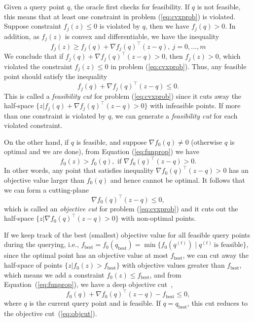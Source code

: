 Given a query point $q$, the oracle first checks for feasibility.
If $q$ is not feasible, this means that at least one constraint in problem (\ref{eq:cvxprob}) is violated.
Suppose constraint $f_j(z) \le 0$ is violated by $q$, then we have $f_j(q) > 0$.
In addition, as $f_j(z)$ is convex and differentiable, we have the inequality
\begin{equation}
\label{eq:funprop}
f_j(z) \ge f_j(q) + \nabla f_j(q)^\top (z - q),~ j = 0, \dots, m
\end{equation}
We conclude that if $f_j(q) + \nabla f_j(q)^\top (z - q) > 0$, then $f_j(z) > 0$, 
which violated the constraint $f_j(z) \le 0$ in problem (\ref{eq:cvxprob}).
Thus, any feasible point should satisfy the inequality
\begin{equation}
\label{eq:feacut}
f_j(q) + \nabla f_j(q)^\top (z - q) \le 0.
\end{equation}
This is called a \textit{feasibility cut} for problem (\ref{eq:cvxprob}) since it cuts away the half-space 
$\{z | f_j(q) + \nabla f_j(q)^\top (z - q) > 0 \}$ with infeasible points.
If more than one constraint is violated by $q$, we can generate a \emph{feasibility cut} for each violated constraint.

On the other hand, if $q$ is feasible, and suppose $\nabla f_0(q) \ne 0$ (otherwise $q$ is optimal and we are done),
from Equation (\ref{eq:funprop}) we have
\begin{equation*}
f_0(z) > f_0(q), \text{~if~} \nabla f_0(q)^\top (z - q) > 0.
\end{equation*}
In other words, any point that satisfies inequality $\nabla f_0(q)^\top (z - q) > 0$ has an objective value larger than $f_0(q)$ 
and hence cannot be optimal.
It follows that we can form a cutting-plane
\begin{equation}
\label{eq:objcut}
\nabla f_0(q)^\top (z - q) \le 0,
\end{equation}
which is called an \textit{objective cut} for problem (\ref{eq:cvxprob}) and 
it cuts out the half-space $\{z | \nabla f_0(q)^\top (z - q) > 0 \}$ with non-optimal points.

If we keep track of the best (smallest) objective value for all feasible query points during the querying, i.e.,
$f_\text{best} = f_0(q_\text{best}) = \min\{f_0(q^{(t)}) \mid q^{(t)} ~\text{is feasible}\}$,
since the optimal point has an objective value at most $f_\text{best}$, 
we can cut away the half-space of points $\{z | f_0(z) > f_\text{best} \}$ with objective values greater than $f_\text{best}$, 
which means we add a constraint $f_0(z) \le f_\text{best}$, and from Equation~(\ref{eq:funprop}), 
we have a deep objective cut~\cite{boydlocalization},
\begin{equation}
\label{eq:deepobjcut}
f_0(q) + \nabla f_0(q)^\top (z - q) - f_\text{best} \le 0,
\end{equation}
where $q$ is the current query point and is feasible. If $q = q_\text{best}$, this cut reduces to the objective cut~(\ref{eq:objcut}).

